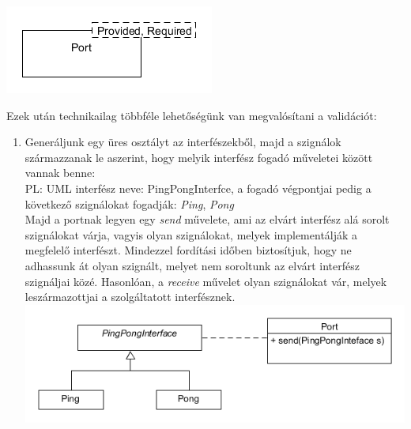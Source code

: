 \documentclass[a4paper,12pt]{report}
\begin{document}
\includegraphics[scale=0.7]{port_class.png}


Ezek után technikailag többféle lehetőségünk van megvalósítani a validációt: \\
\begin{enumerate}

\item Generáljunk egy üres osztályt az interfészekből, majd a szignálok származzanak le aszerint, hogy melyik interfész fogadó műveletei között vannak benne: \\
PL: UML interfész neve: PingPongInterfce, a fogadó végpontjai pedig a következő szignálokat fogadják: \textit{Ping}, \textit{Pong} \\
Majd a portnak legyen egy \textit{send} művelete, ami az elvárt interfész alá sorolt szignálokat várja, vagyis olyan szignálokat, melyek implementálják a megfelelő interfészt.
Mindezzel fordítási időben biztosítjuk, hogy ne adhassunk át olyan szignált, melyet nem soroltunk az elvárt interfész szignáljai közé. Hasonlóan, a \textit{receive} művelet olyan szignálokat vár, melyek leszármazottjai a szolgáltatott interfésznek. \\

\includegraphics[scale=0.7]{inf_ver1.png} \\


\end{enumerate}
\end{document}
